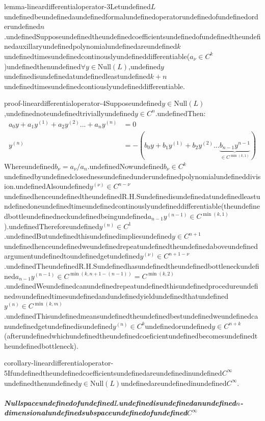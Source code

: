 \begin{mystthmlemma}{}{lemma-lineardifferentialoperator-3}Letundefined$L$undefinedbeundefinedaundefinedformalundefinedoperatorundefinedofundefinedorderundefined$n$.undefinedSupposeundefinedtheundefinedcoefficientsundefinedofundefinedtheundefinedauxillaryundefinedpolynomialundefinedareundefined$k$undefinedtimesundefinedcontinouslyundefineddifferentiable($a_{\nu}\in C^k$)undefinedthenundefined$\forall y\in \mathrm{Null}(L)$,undefined$y$undefinedisundefinedatundefinedleastundefined$k+n$undefinedtimesundefinedcontiouslyundefineddifferentiable.

\end{mystthmlemma}
\begin{mystthmproof}{}{proof-lineardifferentialoperator-4}Supposeundefined$y\in \mathrm{Null}(L)$,undefinednoteundefinedtriviallyundefined$y\in C^n$.undefinedThen:
\begin{equation}
\begin{aligned}
a_0y+a_1y^{(1)}+a_2y^{(2)}...+a_n y^{(n)} &=0 \\
y^{(n)} &= -(b_0y+b_1y^{(1)}+b_2y^{(2)}...\underbrace{b_{n-1}{y}^{n-1}}_{\in C^{\min(k, 1)}})
\end{aligned}
\end{equation}
Whereundefined$b_{\nu}=a_{\nu}/a_{n}$.undefinedNowundefined$b_{\nu}\in C^k$undefinedbyundefinedclosednessundefinedunderundefinedpolynomialundefineddivision.undefinedAlsoundefined$y^{(\nu)} \in C^{n -\nu}$undefinedhenceundefinedtheundefinedR.H.Sundefinedisundefinedatundefinedleastundefinedoneundefinedtimeundefinedcontinouslyundefineddifferentiable(theundefinedbottleundefinedneckundefinedbeingundefined$a_{n -1}y^{(n -1)} \in C^{\min(k, 1)}$).undefinedThereforeundefined$y^{(n)}\in C^1$.undefinedButundefinedthisundefinedimpliesundefined$y\in C^{n+1}$undefinedhenceundefinedweundefinedrepeatundefinedtheundefinedaboveundefinedargumentundefinedtoundefinedgetundefined$y^{(\nu)}\in C^{n+1 -\nu}$.undefinedTheundefinedR.H.Sundefinedhasundefinedtheundefinedbottleneckundefined$a_{n -1}y^{(n -1)}\in C^{\min(k, n+1 -(n -1))}=C^{\min(k, 2)}$.undefinedWeundefinedcanundefinedrepeatundefinedthisundefinedprocedureundefined$m$undefinedtimesundefinedandundefinedyieldundefinedthatundefined$y^{(n)}\in C^{\min(k, m)}$.undefinedThisundefinedmeansundefinedtheundefinedbestundefinedweundefinedcanundefinedgetundefinedisundefined$y^{(n)}\in C^k$undefinedorundefined$y\in C^{n+k}$(afterundefinedwhichundefinedtheundefinedcoeficientundefinedbecomesundefinedtheundefinedbottleneck).

\end{mystthmproof}
\begin{mystthmcorollary}{}{corollary-lineardifferentialoperator-5}Ifundefinedtheundefinedcoefficientsundefinedareundefinedinundefined$C^{\infty}$undefinedthenundefined$y\in \mathrm{Null}(L)$undefinedareundefinedinundefined$C^{\infty}$.

\end{mystthmcorollary}
\subparagraph{Nullspaceundefinedofundefined$L$undefinedisundefinedanundefined$n$-dimensionalundefinedsubspaceundefinedofundefined$C^{\infty}$}

